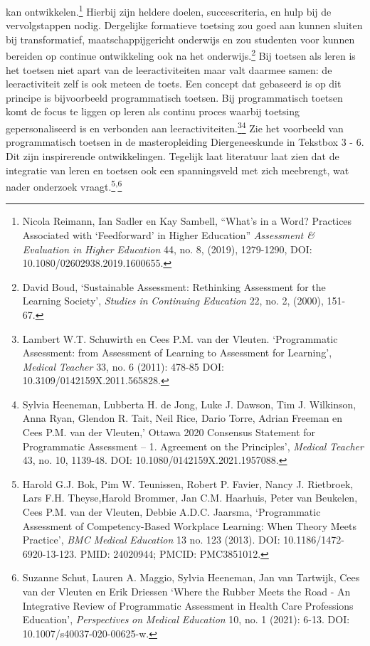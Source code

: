 \documentclass[smallauthor, chapterhaspagenum, nochapterinheader, pagenuminheader,  bigchapnum,medium2, tocpages,  garamond, titleinheader]{jote-book}
\begin{document}
kan ontwikkelen.\footnote{Nicola Reimann, Ian Sadler en Kay Sambell, “What's in a Word? Practices Associated with ‘Feedforward' in Higher Education” \emph{Assessment \& Evaluation in }\emph{Higher}\emph{ }\emph{Education} 44, no. 8, (2019), 1279-1290, DOI: 10.1080/02602938.2019.1600655.} Hierbij zijn heldere doelen, succescriteria, en hulp bij de vervolgstappen nodig. Dergelijke formatieve toetsing zou goed aan kunnen sluiten bij transformatief, maatschappijgericht onderwijs en zou studenten voor kunnen bereiden op continue ontwikkeling ook na het onderwijs.\footnote{David Boud, ‘Sustainable Assessment: Rethinking Assessment for the Learning Society', \emph{Studies in }\emph{Continuing}\emph{ }\emph{Education}\emph{ }22, no. 2, (2000), 151-67.} Bij toetsen als leren is het toetsen niet apart van de leeractiviteiten maar valt daarmee samen: de leeractiviteit zelf is ook meteen de toets. Een concept dat gebaseerd is op dit principe is bijvoorbeeld programmatisch toetsen. Bij programmatisch toetsen komt de focus te liggen op leren als continu proces waarbij toetsing gepersonaliseerd is en verbonden aan leeractiviteiten.\footnote{Lambert W.T. Schuwirth en Cees P.M. van der Vleuten. ‘Programmatic Assessment: from Assessment of Learning to Assessment for Learning', \emph{Medical}\emph{ Teacher}\emph{ }33, no. 6 (2011): 478-85 DOI: 10.3109/0142159X.2011.565828.}\footnote{Sylvia Heeneman, Lubberta H. de Jong, Luke J. Dawson, Tim J. Wilkinson, Anna Ryan, Glendon R. Tait, Neil Rice, Dario Torre, Adrian Freeman en Cees P.M. van der Vleuten,' Ottawa 2020 Consensus Statement for Programmatic Assessment -- 1. Agreement on the Principles', \emph{Medical}\emph{ Teacher}\emph{ }43, no. 10, 1139-48. DOI: 10.1080/0142159X.2021.1957088.} Zie het voorbeeld van programmatisch toetsen in de masteropleiding Diergeneeskunde in Tekstbox 3 - 6. Dit zijn inspirerende ontwikkelingen. Tegelijk laat literatuur laat zien dat de integratie van leren en toetsen ook een spanningsveld met zich meebrengt, wat nader onderzoek vraagt.\footnote{Harold G.J. Bok, Pim W. Teunissen, Robert P. Favier, Nancy J. Rietbroek, Lars F.H. Theyse,Harold Brommer, Jan C.M. Haarhuis, Peter van Beukelen, Cees P.M. van der Vleuten, Debbie A.D.C. Jaarsma, ‘Programmatic Assessment of Competency-Based Workplace Learning: When Theory Meets Practice', \emph{BMC }\emph{Medical}\emph{ }\emph{Education} 13 no. 123 (2013). DOI: 10.1186/1472-6920-13-123. PMID: 24020944; PMCID: PMC3851012.}\textsuperscript{,}\footnote{Suzanne Schut, Lauren A. Maggio, Sylvia Heeneman, Jan van Tartwijk, Cees van der Vleuten en Erik Driessen ‘Where the Rubber Meets the Road - An Integrative Review of Programmatic Assessment in Health Care Professions Education', \emph{Perspectives}\emph{ on }\emph{Medical}\emph{ }\emph{Education}\emph{ }10, no. 1 (2021): 6-13. DOI: 10.1007/s40037-020-00625-w.}\emph{ }
\end{document}
